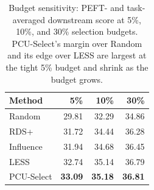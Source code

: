 \begin{table}[t]
\centering
\small
\setlength{\tabcolsep}{6pt}
\caption{Budget sensitivity: PEFT- and task-averaged downstream score at 5\%, 10\%, and 30\% selection budgets. PCU-Select's margin over Random and its edge over LESS are largest at the tight 5\% budget and shrink as the budget grows.}
\label{tab:budget-sensitivity}
\begin{tabular}{lrrr}
\toprule
Method & 5\% & 10\% & 30\% \\
\midrule
Random & 29.81 & 32.29 & 34.86 \\
RDS+ & 31.72 & 34.44 & 36.28 \\
Influence & 31.94 & 34.68 & 36.45 \\
LESS & 32.74 & 35.14 & 36.79 \\
PCU-Select & \textbf{33.09} & \textbf{35.18} & \textbf{36.81} \\
\bottomrule
\end{tabular}
\end{table}
